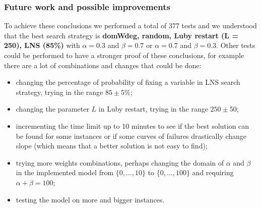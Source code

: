 \documentclass[../main.tex]{subfiles}
\begin{document}
\subsubsection{Future work and possible improvements}
To achieve these conclusions we performed a total of 377 tests and we understood that the best search strategy is \textbf{domWdeg, random, Luby restart (L = 250), LNS (85\%)} with $\alpha = 0.3$ and $\beta = 0.7$ or $\alpha = 0.7$ and $\beta = 0.3$. Other tests could be performed to have a stronger proof of these conclusions, for example there are a lot of combinations and changes that could be done:
\begin{itemize}
    \item changing the percentage of probability of fixing a variable in LNS search strategy, trying in the range $85 \pm 5$\%;
    \item changing the parameter $L$ in Luby restart, trying in the range $250 \pm 50$; 
    \item incrementing the time limit up to 10 minutes to see if the best solution can be found for some instances or if some curves of failures drastically change slope (which means that a better solution is not easy to find);
    \item trying more weights combinations, perhaps changing the domain of $\alpha$ and $\beta$ in the implemented model from $\{0, \dots, 10\}$ to $\{0, \dots, 100\}$ and requiring $\alpha + \beta = 100$;
    \item testing the model on more and bigger instances. 
\end{itemize}
\end{document}
